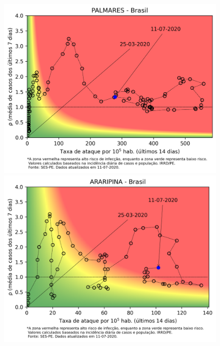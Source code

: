 \documentclass[]{article}
\begin{document}
\begin{figure}[!h]
\begin{minipage}[t]{4cm}
	\centering
	\includegraphics[scale=0.5]{../PALMARES.png}
\end{minipage}
\hspace{5cm}
\begin{minipage}[t]{4cm}
	\centering
	\includegraphics[scale=0.5]{../ARARIPINA.png}
	\vspace{0.2cm}
\end{minipage}
\end{figure}
\end{document}
